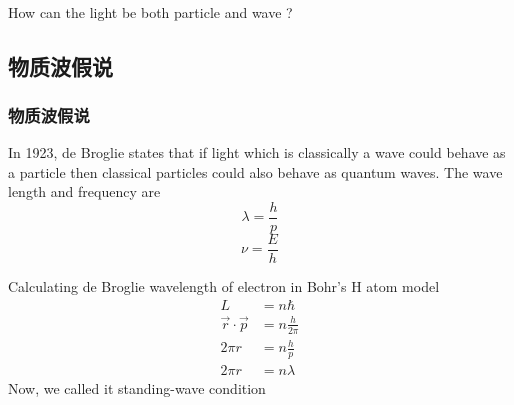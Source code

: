 \begin{frame}
    \frametitle{}
    \begin{tcolorbox3}[学术讨论]
        ~\\
        How can the light be both particle and wave ?
    \end{tcolorbox3}
\end{frame}

\subsection{物质波假说}

\begin{frame}   
  \frametitle{物质波假说}
  \begin{tcolorbox4}
  In 1923, de Broglie states that if light which is classically a wave could behave as a particle
  then classical particles could also behave as quantum waves. The wave length and frequency are
  \[\lambda=\frac{h}{p}\]
  \[\nu =\frac{E}{h}\]
  \end{tcolorbox4}
\end{frame}

\begin{frame}  
    \frame{}
    Calculating de Broglie wavelength of electron in Bohr's H atom model
    \begin{equation*}
        \begin{split}
            L&=n\hbar \\
            \vec{r} \cdot \vec{p} & =  n\frac{h}{2 \pi} \\
            2\pi r&=  n\frac{h}{p}\\
            2\pi r&=  n\lambda 
        \end{split} 
     \end{equation*}
     Now, we called it standing-wave condition 
\end{frame}


